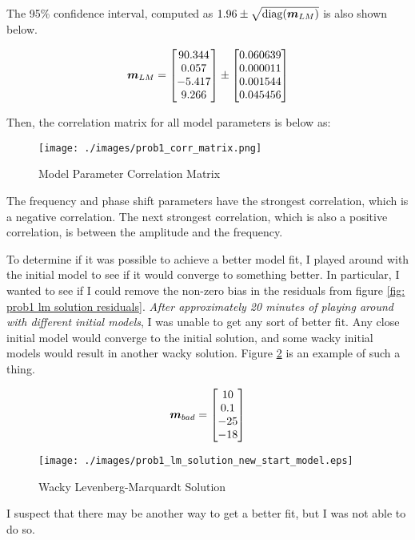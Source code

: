 The 95\% confidence interval, computed as $1.96 \pm \sqrt{\textrm{diag}(\boldsymbol{m}_{LM})}$ is also shown below. 

\begin{align*}
	\boldsymbol{m}_{LM} = \begin{bmatrix} 90.344 \\ 0.057 \\ -5.417 \\ 9.266 \end{bmatrix} \pm \begin{bmatrix} 0.060639 \\ 0.000011 \\ 0.001544 \\ 0.045456 \end{bmatrix}
\end{align*}

Then, the correlation matrix for all model parameters is below as:

\begin{figure}[h] 
	\centering
	\texttt{[image: ./images/prob1\_corr\_matrix.png]}
	\caption{Model Parameter Correlation Matrix}
	\label{fig: prob1 correlation matrix}
\end{figure}
\FloatBarrier

The frequency and phase shift parameters have the strongest correlation, which is a negative correlation. The next strongest correlation, which is also a positive correlation, is between the amplitude and the frequency. 

To determine if it was possible to achieve a better model fit, I played around with the initial model to see if it would converge to something better. In particular, I wanted to see if I could remove the non-zero bias in the residuals from figure \ref{fig: prob1 lm solution residuals}. \textit{After approximately 20 minutes of playing around with different initial models}, I was unable to get any sort of better fit. Any close initial model would converge to the initial solution, and some wacky initial models would result in another wacky solution. Figure \ref{fig: prob1 wacky lm solution} is an example of such a thing. 

\begin{align*}
	\boldsymbol{m}_{bad} = \begin{bmatrix} 10 \\ 0.1 \\ -25 \\ -18 \end{bmatrix}
\end{align*}

\begin{figure}[h] 
	\centering
	\texttt{[image: ./images/prob1\_lm\_solution\_new\_start\_model.eps]}
	\caption{Wacky Levenberg-Marquardt Solution}
	\label{fig: prob1 wacky lm solution}
\end{figure}
\FloatBarrier

I suspect that there may be another way to get a better fit, but I was not able to do so. 

